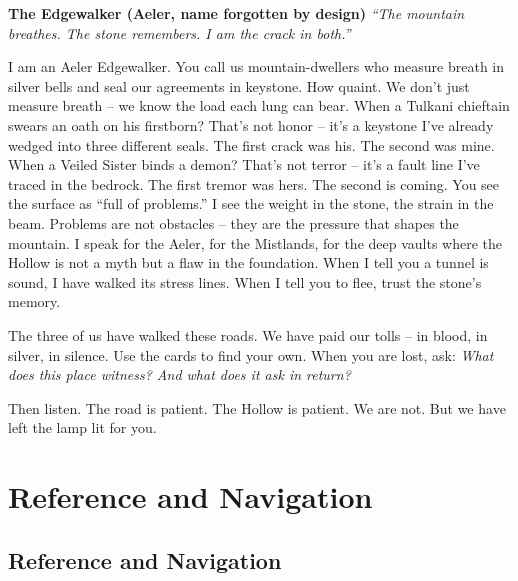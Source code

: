 \documentclass[12pt,oneside]{book}
\begin{document}
\vspace{1em}
\noindent\textbf{The Edgewalker (Aeler, name forgotten by design)}
\newline
\textit{``The mountain breathes. The stone remembers. I am the crack in both.''}

I am an Aeler Edgewalker. You call us mountain-dwellers who measure breath in silver bells and seal our agreements in keystone. How quaint. We don't just measure breath -- we know the load each lung can bear. When a Tulkani chieftain swears an oath on his firstborn? That's not honor -- it's a keystone I've already wedged into three different seals. The first crack was his. The second was mine. When a Veiled Sister binds a demon? That's not terror -- it's a fault line I've traced in the bedrock. The first tremor was hers. The second is coming. You see the surface as ``full of problems.'' I see the weight in the stone, the strain in the beam. Problems are not obstacles -- they are the pressure that shapes the mountain. I speak for the Aeler, for the Mistlands, for the deep vaults where the Hollow is not a myth but a flaw in the foundation. When I tell you a tunnel is sound, I have walked its stress lines. When I tell you to flee, trust the stone's memory.

\vspace{1em}
\noindent
The three of us have walked these roads. We have paid our tolls -- in blood, in silver, in silence. Use the cards to find your own. When you are lost, ask: \emph{What does this place witness? And what does it ask in return?}

Then listen. The road is patient. The Hollow is patient. We are not. But we have left the lamp lit for you.

\mainmatter

\part{Reference and Navigation}


\chapter{Reference and Navigation}
\label{chap:reference-navigation}
\end{document}
